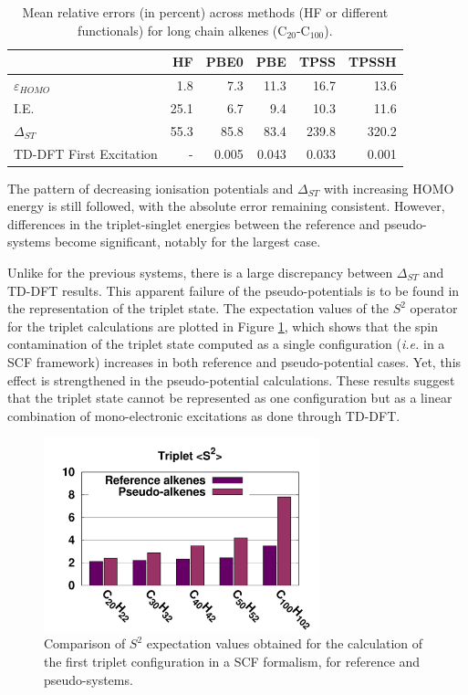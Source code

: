 \documentclass[aip]{revtex4-1}
\begin{document}
\begin{table}[ht]
\begin{tabular}{l r r r r r }
\hline\hline
                 & HF & PBE0 & PBE & TPSS & TPSSH \\
\hline
$\varepsilon_{HOMO}$    &  1.8 &  7.3   &  11.3   &  16.7    &  13.6 \\
I.E.                    & 25.1 &  6.7   &   9.4   &  10.3    &  11.6 \\
$\Delta_{ST}$           & 55.3 & 85.8   &  83.4   & 239.8    & 320.2 \\
TD-DFT First Excitation &    - &  0.005 &   0.043 &    0.033 &   0.001 \\ 
\hline\hline
\end{tabular}
\caption{Mean relative errors (in percent) across methods (HF or different functionals)
for long chain alkenes (C\(_{20}\)-C\(_{100}\)).}
\label{table:long_alkene_errors}
\end{table}

The pattern of decreasing ionisation potentials and $\Delta_{ST}$ with increasing HOMO
energy is still followed, with the absolute error remaining consistent.
However, differences in the triplet-singlet energies between the reference and pseudo-systems 
become significant, notably for the largest case.

Unlike for the previous systems, there is a large discrepancy between $\Delta_{ST}$
and TD-DFT results.
This apparent failure of the pseudo-potentials is to be found in the representation
of the triplet state. The expectation values of the $S^2$ operator for the triplet calculations
are plotted in Figure \ref{fig:ssquare}, which shows that the spin contamination
of the triplet state computed as a single configuration (\emph{i.e.} in a SCF
framework) increases in both reference and pseudo-potential cases.
Yet, this effect is strengthened in the pseudo-potential calculations.
These results suggest that the triplet state cannot be represented as one configuration
but as a linear combination of mono-electronic excitations as done through TD-DFT.

\begin{figure}
\begin{center}
\includegraphics[width=8cm]{long_pbe0_s2}
\end{center}
\caption{Comparison of $S^2$ expectation values obtained for the calculation
of the first triplet configuration in a SCF formalism, for reference
and pseudo-systems.}
\label{fig:ssquare}
\end{figure}
\end{document}
